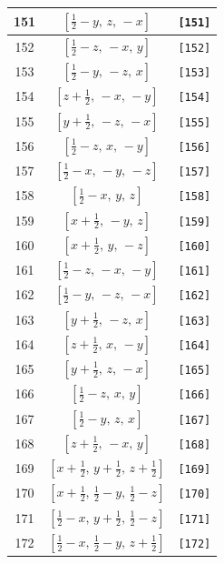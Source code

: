 \documentclass[fleqn,8pt]{jsarticle}
\begin{document}
\begin{longtable}{ccc}
151 & $\left[ \frac{1}{2} - y,\, z,\, - x \right]$ & {\tt [151]} \\ \hline
152 & $\left[ \frac{1}{2} - z,\, - x,\, y \right]$ & {\tt [152]} \\ \hline
153 & $\left[ \frac{1}{2} - y,\, - z,\, x \right]$ & {\tt [153]} \\ \hline
154 & $\left[ z + \frac{1}{2},\, - x,\, - y \right]$ & {\tt [154]} \\ \hline
155 & $\left[ y + \frac{1}{2},\, - z,\, - x \right]$ & {\tt [155]} \\ \hline
156 & $\left[ \frac{1}{2} - z,\, x,\, - y \right]$ & {\tt [156]} \\ \hline
157 & $\left[ \frac{1}{2} - x,\, - y,\, - z \right]$ & {\tt [157]} \\ \hline
158 & $\left[ \frac{1}{2} - x,\, y,\, z \right]$ & {\tt [158]} \\ \hline
159 & $\left[ x + \frac{1}{2},\, - y,\, z \right]$ & {\tt [159]} \\ \hline
160 & $\left[ x + \frac{1}{2},\, y,\, - z \right]$ & {\tt [160]} \\ \hline
161 & $\left[ \frac{1}{2} - z,\, - x,\, - y \right]$ & {\tt [161]} \\ \hline
162 & $\left[ \frac{1}{2} - y,\, - z,\, - x \right]$ & {\tt [162]} \\ \hline
163 & $\left[ y + \frac{1}{2},\, - z,\, x \right]$ & {\tt [163]} \\ \hline
164 & $\left[ z + \frac{1}{2},\, x,\, - y \right]$ & {\tt [164]} \\ \hline
165 & $\left[ y + \frac{1}{2},\, z,\, - x \right]$ & {\tt [165]} \\ \hline
166 & $\left[ \frac{1}{2} - z,\, x,\, y \right]$ & {\tt [166]} \\ \hline
167 & $\left[ \frac{1}{2} - y,\, z,\, x \right]$ & {\tt [167]} \\ \hline
168 & $\left[ z + \frac{1}{2},\, - x,\, y \right]$ & {\tt [168]} \\ \hline
169 & $\left[ x + \frac{1}{2},\, y + \frac{1}{2},\, z + \frac{1}{2} \right]$ & {\tt [169]} \\ \hline
170 & $\left[ x + \frac{1}{2},\, \frac{1}{2} - y,\, \frac{1}{2} - z \right]$ & {\tt [170]} \\ \hline
171 & $\left[ \frac{1}{2} - x,\, y + \frac{1}{2},\, \frac{1}{2} - z \right]$ & {\tt [171]} \\ \hline
172 & $\left[ \frac{1}{2} - x,\, \frac{1}{2} - y,\, z + \frac{1}{2} \right]$ & {\tt [172]} \\ \hline

\end{longtable}
\end{document}
